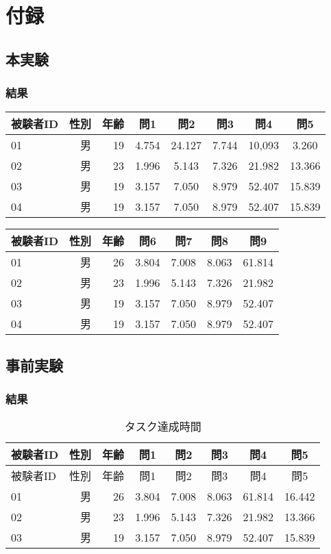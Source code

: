 \chapter{付録}\label{chap:appendix}

\section{本実験}\label{ux672cux5b9fux9a13}

\subsection{結果}\label{ux7d50ux679c}

\begin{longtable}[c]{@{}lrrccccc@{}}
\toprule
被験者ID & 性別 & 年齢 & 問1 & 問2 & 問3 & 問4 & 問5\tabularnewline
\midrule
\endhead
01 & 男 & 19 & 4.754 & 24.127 & 7.744 & 10,093 & 3.260\tabularnewline
02 & 男 & 23 & 1.996 & 5.143 & 7.326 & 21.982 & 13.366\tabularnewline
03 & 男 & 19 & 3.157 & 7.050 & 8.979 & 52.407 & 15.839\tabularnewline
04 & 男 & 19 & 3.157 & 7.050 & 8.979 & 52.407 & 15.839\tabularnewline
\bottomrule
\end{longtable}

\begin{longtable}[c]{@{}lrrcccc@{}}
\toprule
被験者ID & 性別 & 年齢 & 問6 & 問7 & 問8 & 問9\tabularnewline
\midrule
\endhead
01 & 男 & 26 & 3.804 & 7.008 & 8.063 & 61.814\tabularnewline
02 & 男 & 23 & 1.996 & 5.143 & 7.326 & 21.982\tabularnewline
03 & 男 & 19 & 3.157 & 7.050 & 8.979 & 52.407\tabularnewline
04 & 男 & 19 & 3.157 & 7.050 & 8.979 & 52.407\tabularnewline
\bottomrule
\end{longtable}

\section{事前実験}\label{ux4e8bux524dux5b9fux9a13}

\subsection{結果}\label{ux7d50ux679c-1}

\begin{longtable}[c]{@{}lrrccccc@{}}
\caption{タスク達成時間}\tabularnewline
\toprule
被験者ID & 性別 & 年齢 & 問1 & 問2 & 問3 & 問4 & 問5\tabularnewline
\midrule
\endfirsthead
\toprule
被験者ID & 性別 & 年齢 & 問1 & 問2 & 問3 & 問4 & 問5\tabularnewline
\midrule
\endhead
01 & 男 & 26 & 3.804 & 7.008 & 8.063 & 61.814 & 16.442\tabularnewline
02 & 男 & 23 & 1.996 & 5.143 & 7.326 & 21.982 & 13.366\tabularnewline
03 & 男 & 19 & 3.157 & 7.050 & 8.979 & 52.407 & 15.839\tabularnewline
\bottomrule
\end{longtable}

